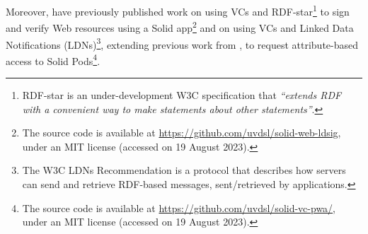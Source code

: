 Moreover, \cite{braun_selfverifying_2022,braun_attributebased_2022} have previously published work on using VCs and RDF-star\footnote{RDF-star\citep{arndt_rdfstar_2023} is an under-development W3C specification that \textit{``extends RDF with a convenient way to make statements about other statements''}.} to sign and verify Web resources using a Solid app\footnote{The source code is available at \url{https://github.com/uvdsl/solid-web-ldsig}, under an MIT license (accessed on 19 August 2023).} and on using VCs and Linked Data Notifications (LDNs)\footnote{The W3C LDNs Recommendation \citep{capadisli_linked_2017} is a protocol that describes how servers can send and retrieve RDF-based messages, sent/retrieved by applications.}, extending previous work from \citeauthor{ezike_solidvc_2019}, to request attribute-based access to Solid Pods\footnote{The source code is available at \url{https://github.com/uvdsl/solid-vc-pwa/}, under an MIT license (accessed on 19 August 2023).}.



